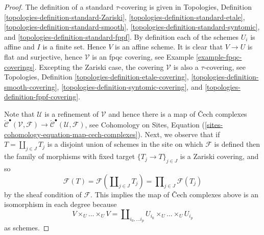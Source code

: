 \documentclass[10pt,a4paper]{amsart}
\theoremstyle{plain}
\theoremstyle{definition}
\theoremstyle{remark}
\numberwithin{equation}{subsection}
\begin{document}
\begin{proof}
The definition of a standard $\tau$-covering is given in
Topologies, Definition
\ref{topologies-definition-standard-Zariski},
\ref{topologies-definition-standard-etale},
\ref{topologies-definition-standard-smooth},
\ref{topologies-definition-standard-syntomic}, and
\ref{topologies-definition-standard-fppf}.
By definition each of the schemes
$U_i$ is affine and $I$ is a finite set. Hence $V$ is an affine scheme.
It is clear that $V \to U$ is flat and surjective, hence
$\mathcal{V}$ is an fpqc covering, see
Example \ref{example-fpqc-coverings}.
Excepting the Zariski case, the covering $\mathcal{V}$
is also a $\tau$-covering, see
Topologies, Definition
\ref{topologies-definition-etale-covering},
\ref{topologies-definition-smooth-covering},
\ref{topologies-definition-syntomic-covering}, and
\ref{topologies-definition-fppf-covering}.

\medskip\noindent
Note that $\mathcal{U}$ is a refinement of $\mathcal{V}$
and hence there is a map of {\v C}ech complexes
$\check{\mathcal{C}}^\bullet (\mathcal{V}, \mathcal{F}) \to
\check{\mathcal{C}}^\bullet (\mathcal{U}, \mathcal{F})$, see
Cohomology on Sites,
Equation (\ref{sites-cohomology-equation-map-cech-complexes}).
Next, we observe that if $T = \coprod_{j \in J} T_j$ is a
disjoint union of schemes in the site on which $\mathcal{F}$ is defined
then the family of morphisms with fixed target
$\{T_j \to T\}_{j \in J}$ is a Zariski covering, and so
\begin{equation}
\label{equation-sheaf-coprod}
\mathcal{F}(T) =
\mathcal{F}(\coprod\nolimits_{j \in J} T_j) =
\prod\nolimits_{j \in J} \mathcal{F}(T_j)
\end{equation}
by the sheaf condition of $\mathcal{F}$.
This implies the map of {\v C}ech complexes above is an isomorphism
in each degree because
$$
V \times_U \ldots \times_U V
=
\coprod\nolimits_{i_0, \ldots i_p} U_{i_0} \times_U \ldots \times_U U_{i_p}
$$
as schemes.
\end{proof}
\end{document}
